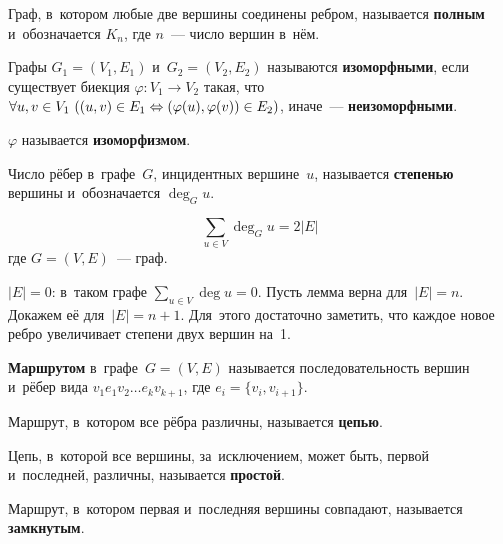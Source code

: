 \begin{definition}
	Граф, в~котором любые две вершины соединены ребром, называется \textbf{полным} и~обозначается $K_n$, где $n$~--- число вершин в~нём.
\end{definition}

\begin{definition}
	Графы $G_1 = (V_1, E_1)$ и~$G_2 = (V_2, E_2)$ называются \textbf{изоморфными}, если существует биекция $\varphi \colon V_1 \to V_2$ такая, что
	$\forall u, v \in V_1 \ \allowbreak ((u, v) \in E_1 \opbr\Leftrightarrow (\varphi(u), \varphi(v)) \in E_2)$, иначе~--- \textbf{неизоморфными}.
	
	$\varphi$ называется \textbf{изоморфизмом}.
\end{definition}

\begin{definition}
	Число рёбер в~графе~$G$, инцидентных вершине~$u$, называется \textbf{степенью} вершины и~обозначается $\deg_G u$.
\end{definition}

\begin{lemma}[о рукопожатиях]
	\[ \sum_{u \in V} \deg_G u = 2|E| \]
	где $G = (V, E)$~--- граф.
\end{lemma}
\begin{proofmathind}
	\indbase $|E| = 0$: в~таком графе $\displaystyle \sum_{u \in V} \deg u = 0$.
	\newpage
	\indstep Пусть лемма верна для~$|E| = n$.
	Докажем её для~$|E| = n + 1$.
	Для~этого достаточно заметить, что каждое новое ребро увеличивает степени двух вершин на~1.
	\indend
\end{proofmathind}

\begin{definition}
	\textbf{Маршрутом} в~графе~$G = (V, E)$ называется последовательность вершин и~рёбер вида $v_1 e_1 v_2 \ldots e_k v_{k+1}$, где $e_i = \{ v_i, v_{i+1} \}$.
\end{definition}

\begin{definition}
	Маршрут, в~котором все рёбра различны, называется \textbf{цепью}.
\end{definition}

\begin{definition}
	Цепь, в~которой все вершины, за~исключением, может быть, первой и~последней, различны, называется \textbf{простой}.
\end{definition}

\begin{definition}
	Маршрут, в~котором первая и~последняя вершины совпадают, называется \textbf{замкнутым}.
\end{definition}

